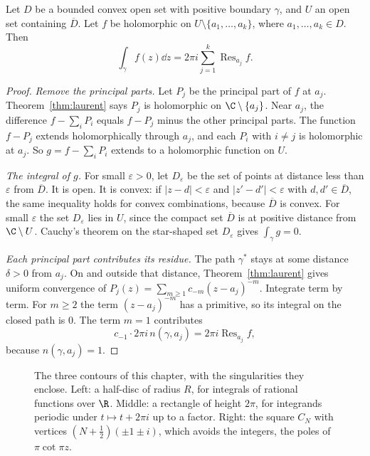 \begin{theorem}\label{thm:residue}
Let $D$ be a bounded convex open set with positive boundary $\gamma$, and $U$ an open set containing $\overline D$. Let $f$ be holomorphic on
$U\setminus\{a_1,\dots,a_k\}$, where $a_1,\dots,a_k\in D$. Then
\[
\int_\gamma f(z)\dd z=2\pi i\sum_{j=1}^k\operatorname{Res}_{a_j}f.
\]
\end{theorem}
\begin{proof}
\textit{Remove the principal parts.} Let $P_j$ be the principal part of $f$ at $a_j$. Theorem~\ref{thm:laurent} says $P_j$ is holomorphic on $\C\setminus\{a_j\}$. Near $a_j$, the difference $f-\sum_i P_i$ equals $f-P_j$ minus the other principal parts. The function $f-P_j$ extends holomorphically through $a_j$, and each $P_i$ with $i\ne j$ is holomorphic at $a_j$. So $g=f-\sum_i P_i$ extends to a holomorphic function on $U$.

\textit{The integral of $g$.} For small $\varepsilon>0$, let $D_\varepsilon$ be the set of points at distance less than $\varepsilon$ from $\overline D$. It is open. It is convex: if $|z-d|<\varepsilon$ and $|z'-d'|<\varepsilon$ with $d,d'\in\overline D$, the same inequality holds for convex combinations, because $\overline D$ is convex. For small $\varepsilon$ the set $D_\varepsilon$ lies in $U$, since the compact set $\overline D$ is at positive distance from $\C\setminus U$. Cauchy's theorem on the star-shaped set $D_\varepsilon$ gives $\int_\gamma g=0$.

\textit{Each principal part contributes its residue.} The path $\gamma^*$ stays at some distance $\delta>0$ from $a_j$. On and outside that distance, Theorem~\ref{thm:laurent} gives uniform convergence of $P_j(z)=\sum_{m\ge1}c_{-m}(z-a_j)^{-m}$. Integrate term by term. For $m\ge2$ the term $(z-a_j)^{-m}$ has a primitive, so its integral on the closed path is $0$. The term $m=1$ contributes
\[
c_{-1}\cdot 2\pi i\,n(\gamma,a_j)=2\pi i\operatorname{Res}_{a_j}f,
\]
because $n(\gamma,a_j)=1$.
\end{proof}

\begin{figure}[ht]
\centering
{}
\caption{The three contours of this chapter, with the singularities they enclose. Left: a half-disc of radius $R$, for integrals of
rational functions over $\R$. Middle: a rectangle of height $2\pi$, for integrands periodic under $t\mapsto t+2\pi i$ up to a factor. Right:
the square $C_N$ with vertices $(N+\frac12)(\pm1\pm i)$, which avoids the integers, the poles of $\pi\cot\pi z$.}
\label{fig:contours}
\end{figure}

